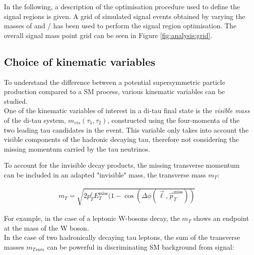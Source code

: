 In the following, a description of the optimisation procedure used to define the signal regions is given.
A grid of simulated signal events obtained by varying the masses of \None and \Cone / \Ntwo has been used to perform the signal region optimisation.
The overall signal mass point grid can be seen in Figure \ref{fig:analysis:grid}.

\subsection{Choice of kinematic variables}
To understand the difference between a potential supersymmetric particle production compared to a \ac{SM} process,  various kinematic variables can be studied.  \\
One of the kinematic variables of interest in a di-tau final state is the \textit{visible mass} of the di-tau system, $m_{vis}(\tau_1,\tau_2)$, constructed using the four-momenta of the two leading tau candidates in the event.  This variable only takes into account the visible components of the hadronic decaying tau, therefore not considering the missing momentum carried by the tau neutrinos.

To account for the invisible decay products,  the missing transverse momentum can be included in an adapted "invisible" mass, the transverse mass $m_T$:

\begin{align}
\label{eq:sr_optimisation:mt} m_T = \sqrt{2p_T^{\ell}E_T^{\text{miss}}(1-\cos(\Delta \phi(\vec{\ell},\vec{p}_T^{\text{miss}}))}
\end{align}

For example,  in the case of a leptonic W-bosons decay, the $m_T$ shows an endpoint at the mass of the W boson. \\
In the case of two hadronically decaying tau leptons,  the sum of the transverse masses $m_{Tsum}$ can be powerful in discriminating \ac{SM} background from signal:

